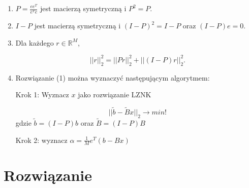 \documentclass[a4paper]{article}
\newcommand{\R}{\mathbb R} %
\begin{document}
      \begin{enumerate}[label=(\alph*)]
         \item
            $P = \frac{ee^{T}}{e^{T}e}$ jest macierzą symetryczną i $P^{2} = P$.

         \item
            $I - P$ jest macierzą symetryczną i $(I - P)^{2} = I - P$ oraz $(I - P)e = 0$.

         \item
            Dla każdego $r \in \R^{M}$,

            \[
               ||r||_{2}^{2} = ||P r||_{2}^{2} + ||(I - P) r||_{2}^{2}.
            \]

         \item
            Rozwiązanie (1) można wyznaczyć następującym algorytmem:

            Krok 1: Wyznacz $x$ jako rozwiązanie LZNK

            \[
               ||\tilde{b} - \tilde{B}x||_{2} \longrightarrow min!
            \]
            gdzie $\tilde{b} = (I - P)b$ oraz $\tilde{B} = (I - P)B$

            Krok 2: wyznacz $\alpha = \frac{1}{M}e^{T}(b - Bx)$
      \end{enumerate}


   \section*{\large Rozwiązanie}
\end{document}
